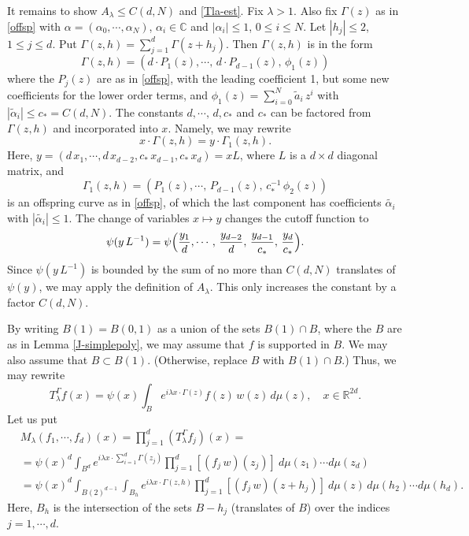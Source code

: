 \documentclass[11 pt]{amsart}
\theoremstyle{plain}
\numberwithin{equation}{section}
\theoremstyle{plain}
\numberwithin{equation}{section}
\theoremstyle{remark}
\begin{document}
It remains to show $A_{\lambda} \le C(d, N)$ and \eqref{Tla-est}. Fix ${\lambda} >1$. Also fix $\Gamma(z)$ as in \eqref{offsp} with $\alpha =(\alpha _0, \cdots, \alpha _N)$, $\alpha _i \in {{\mathbb {C}}}$ and $|\alpha _i|\le 1$, $0\le i\le N$. Let $|h_j| \le 2$, $1\le j\le d$.
Put $\Gamma(z,h) = \sum_{j =1}^d \Gamma (z+h_j)$. Then
$\Gamma(z,h)$ is in the form
\begin{equation}\label{Gzh}
\Gamma(z,h) = ( d \cdot P_1(z), \cdots, \, d \cdot P_{d-1}(z),\, \phi_1(z))
\end{equation}
where the $P_j(z)$ are as in \eqref{offsp}, with the leading coefficient 1, but some new coefficients for the lower order terms, and $\phi_1(z) = \sum_{i=0}^N \tilde{a}_i \, z^i$ with $|\tilde{\alpha}_i | \le c_* = C(d,N)$. The constants $d, \cdots, \, d, c_*$ and $c_*$ can be factored from $\Gamma (z,h)$ and incorporated into $x$. Namely, we may rewrite
  \[ x\cdot  \Gamma(z,h) = y \cdot \Gamma_1 (z,h) .
 \]
  Here, $y= (d \,x_1, \cdots, d\, x_{d-2}, c_* \,x_{d-1}, c_* \,x_{d})= x L$, where $L$ is a $d\times d$ diagonal matrix, and
  \[ \Gamma_1 (z,h) = ( P_1(z), \cdots, \,P_{d-1}(z), \, c_*^{-1} \, \phi_2(z))
  \]
 is an offspring curve as in \eqref{offsp}, of which the last component has coefficients $\widetilde{\alpha_i}$ with $|\widetilde{\alpha_i}| \le 1$.
The change of variables $x\mapsto y$ changes the cutoff function to
\[ \psi(y \,L^{-1}) = \psi\Big( {y_1\over d}, \cdots, \,{y_{d-2}\over d}, \,
{y_{d-1}\over c_*}, \,{y_{d}\over c_*}\Big) .
\]
Since $\psi(y \,L^{-1})$ is bounded by the sum of no more than $C(d,N)$ translates of $\psi(y)$, we may apply the definition of
$A_{\lambda}$. This only increases the constant by a factor $C(d,N)$.

\medskip

By writing $B(1) = B(0,1)$ as a union of the sets $B(1) \cap B$, where the $B$ are as in
Lemma \ref{J-simplepoly},
we may assume that $f$ is supported in $B$. We may also assume that $B\subset B(1)$. (Otherwise, replace $B$ with $B(1) \cap B$.)
Thus, we may rewrite
\begin{equation}\label{Tla-n}
T_{\lambda}^{\Gamma} f(x)=  \psi(x) \int_{B} e^{i{\lambda} x\cdot
\Gamma (z)} f(z) \, w (z) \, d\mu(z), \quad x\in {{\mathbb {R}}}^{2d} .
\end{equation}
Let us put
\begin{align*}\label{}
&M_{\lambda} (f_1, \cdots, f_d)(x) = \prod_{j=1}^d (T_{\lambda}^{\Gamma}
f_j)(x) = \\
&= \psi(x)^d \int_{B^d} e^{i{\lambda} x\cdot \sum_{i=1}^d
\Gamma(z_j)} \prod_{j=1}^d [(f_j \, w)(z_j) ]\ d\mu(z_1)\cdots
d\mu(z_d) \\
&= \psi(x)^d \int_{B(2)^{d-1}} \int_{B_h} e^{i{\lambda} x\cdot
\Gamma(z,h)} \prod_{j=1}^d [(f_j \, w)(z+ h_j)]\ d\mu(z)\,
d\mu(h_2)\cdots d\mu(h_d) .
\end{align*}
Here, $B_h$ is the intersection of the sets $B - h_j$ (translates of $B$)
over the indices $j=1, \cdots, d$.
\end{document}

